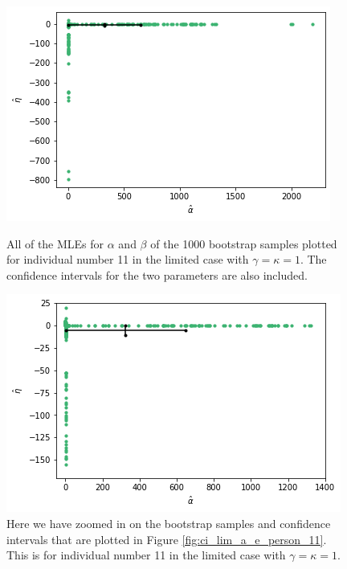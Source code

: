 \begin{figure}
    \centering
    \begin{minipage}{0.48\textwidth}
        \centering
        \includegraphics[scale=0.37]{pictures/ci_lim_a_e_person11.png}
        \caption[MLEs for $\alpha$ and $\eta$ for bootstrap samples individual 11, limited]{All of the MLEs for $\alpha$ and $\beta$ of the 1000 bootstrap samples plotted for individual number 11 in the limited case with $\gamma=\kappa=1$. The confidence intervals for the two parameters are also included.}
        \label{fig:ci_lim_a_e_person_11}
    \end{minipage}\hfill
    \begin{minipage}{0.48\textwidth}
        \centering
        \includegraphics[scale=0.37]{pictures/ci_lim_a_e_person11_zoomed.png}
        \caption[MLEs for $\alpha$ and $\eta$ of bootstrap samples individual 11, unlimited, zoomed]{Here we have zoomed in on the bootstrap samples and confidence intervals that are plotted in Figure \ref{fig:ci_lim_a_e_person_11}. This is for individual number 11 in the limited case with $\gamma=\kappa=1$.}
        \label{fig:ci_lim_a_e_person_11_zoomed}
    \end{minipage}
\end{figure}

